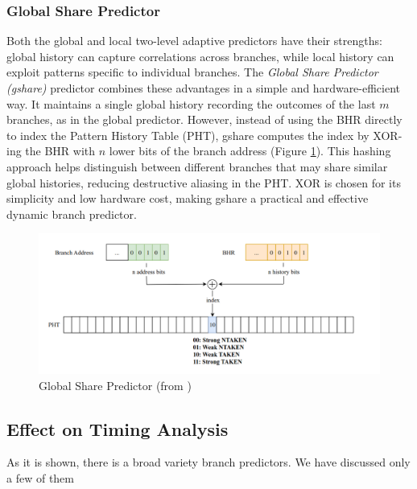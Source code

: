 \subsubsection{Global Share Predictor}

Both the global and local two-level adaptive predictors have their strengths: global history can capture correlations across branches, while local history can exploit patterns specific to individual branches. The \textit{Global Share Predictor (gshare)} predictor combines these advantages in a simple and hardware-efficient way. It maintains a single global history recording the outcomes of the last $m$ branches, as in the global predictor. However, instead of using the BHR directly to index the Pattern History Table (PHT), gshare computes the index by XOR-ing the BHR with $n$ lower bits of the branch address (Figure \ref{fig:bp-gshare}). This hashing approach helps distinguish between different branches that may share similar global histories, reducing destructive aliasing in the PHT. XOR is chosen for its simplicity and low hardware cost, making gshare a practical and effective dynamic branch predictor.

\begin{figure}
    \includegraphics[width=\textwidth]{figures/bp-gshare.png}
    \caption{Global Share Predictor (from \cite{mahling_reverse_2023})}
    \label{fig:bp-gshare}
\end{figure}

\subsection{Effect on Timing Analysis}

As it is shown, there is a broad variety branch predictors. We have discussed only a few of them 

\TODO{!!!}